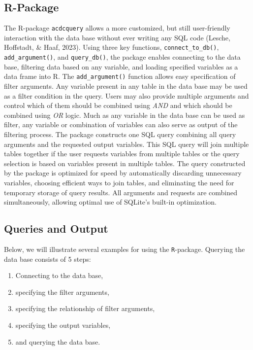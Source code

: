 \documentclass[
  man,floatsintext]{apa6}
\providecommand{\tightlist}{%
  \setlength{\itemsep}{0pt}\setlength{\parskip}{0pt}}
\begin{document}
\hypertarget{r-package}{%
\subsection{R-Package}\label{r-package}}

The R-package \texttt{acdcquery} allows a more customized, but still user-friendly interaction with the data base without ever writing any SQL code (Lesche, Hoffstadt, \& Haaf, 2023). Using three key functions, \texttt{connect\_to\_db()}, \texttt{add\_argument()}, and \texttt{query\_db()}, the package enables connecting to the data base, filtering data based on any variable, and loading specified variables as a data frame into R. The \texttt{add\_argument()} function allows easy specification of filter arguments. Any variable present in any table in the data base may be used as a filter condition in the query. Users may also provide multiple arguments and control which of them should be combined using \emph{AND} and which should be combined using \emph{OR} logic. Much as any variable in the data base can be used as filter, any variable or combination of variables can also serve as output of the filtering process. The package constructs one SQL query combining all query arguments and the requested output variables. This SQL query will join multiple tables together if the user requests variables from multiple tables or the query selection is based on variables present in multiple tables. The query constructed by the package is optimized for speed by automatically discarding unnecessary variables, choosing efficient ways to join tables, and eliminating the need for temporary storage of query results. All arguments and requests are combined simultaneously, allowing optimal use of SQLite's built-in optimization.

\hypertarget{queries-and-output}{%
\subsection{Queries and Output}\label{queries-and-output}}

Below, we will illustrate several examples for using the \texttt{R}-package. Querying the data base consists of 5 steps:

\begin{enumerate}
\def\labelenumi{\arabic{enumi}.}
\tightlist
\item
  Connecting to the data base,
\item
  specifying the filter arguments,
\item
  specifying the relationship of filter arguments,
\item
  specifying the output variables,
\item
  and querying the data base.
\end{enumerate}
\end{document}
